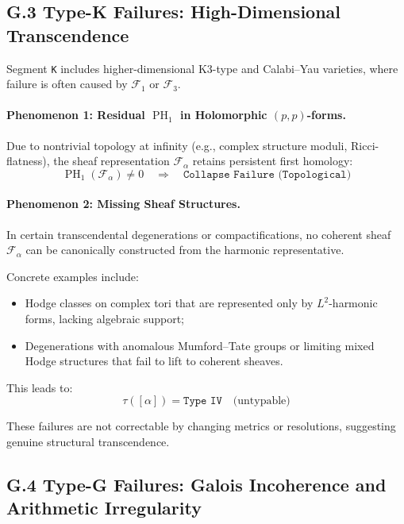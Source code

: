 \documentclass[11pt]{article}
\DeclareMathOperator{\PH}{PH}
\begin{document}
\subsection*{G.3 Type-K Failures: High-Dimensional Transcendence}

Segment \texttt{K} includes higher-dimensional K3-type and Calabi–Yau varieties, where failure is often caused by $\mathcal{F}_1$ or $\mathcal{F}_3$.

\paragraph{Phenomenon 1: Residual $\PH_1$ in Holomorphic $(p,p)$-forms.}

Due to nontrivial topology at infinity (e.g., complex structure moduli, Ricci-flatness), the sheaf representation $\mathcal{F}_\alpha$ retains persistent first homology:
\[
\PH_1(\mathcal{F}_\alpha) \ne 0 \quad \Rightarrow \quad \texttt{Collapse Failure (Topological)}
\]

\paragraph{Phenomenon 2: Missing Sheaf Structures.}

In certain transcendental degenerations or compactifications, no coherent sheaf $\mathcal{F}_\alpha$ can be canonically constructed from the harmonic representative.

Concrete examples include:

\begin{itemize}
  \item Hodge classes on complex tori that are represented only by $L^2$-harmonic forms, lacking algebraic support;
  \item Degenerations with anomalous Mumford–Tate groups or limiting mixed Hodge structures that fail to lift to coherent sheaves.
\end{itemize}

This leads to:
\[
\tau([\alpha]) = \texttt{Type IV}
\quad \text{(untypable)}
\]

These failures are not correctable by changing metrics or resolutions, suggesting genuine structural transcendence.

\subsection*{G.4 Type-G Failures: Galois Incoherence and Arithmetic Irregularity}
\end{document}
